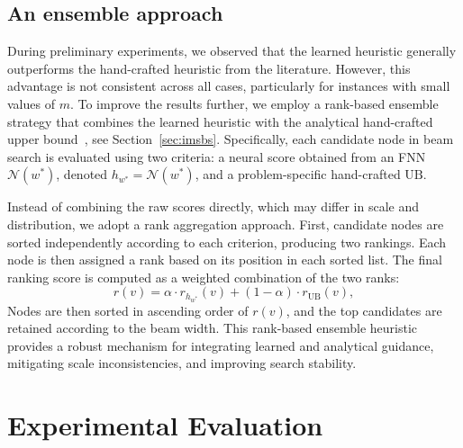 \documentclass[runningheads]{llncs}
\begin{document}
    
  \subsection{An ensemble approach}
    
    During preliminary experiments, we observed that the learned heuristic generally outperforms the hand-crafted heuristic from the literature. However, this advantage is not consistent across all cases, particularly for instances with small values of $m$.  To improve the results further, we employ a rank-based ensemble strategy that combines the learned heuristic with the analytical hand-crafted upper bound~\cite{djukanovic2026_eurocast}, see Section~\ref{sec:imsbs}.  Specifically, each candidate node in beam search is evaluated using two criteria: a neural score obtained from an FNN $\mathcal{N}(w^*)$, denoted $h_{w^*}=\mathcal{N}({w^*})$,  and  a problem-specific hand-crafted $\text{UB}$. 
    
    Instead of combining the raw scores directly, which may differ in scale and distribution, we adopt a rank aggregation approach. First, candidate nodes are sorted independently according to each criterion, producing two rankings. Each node is then assigned a rank based on its position in each sorted list.   The final ranking score is computed as a weighted combination of the two ranks:
    \begin{equation}\label{eq:ensemble_heuristic}
        r(v) = \alpha \cdot r_{h_{w^*}}(v) + (1 - \alpha) \cdot r_{\text{UB}}(v),
    \end{equation}
    Nodes are then sorted in ascending order of $r(v)$, and the top candidates are retained according to the beam width. This rank-based ensemble heuristic provides a robust mechanism for integrating learned and analytical guidance, mitigating scale inconsistencies, and improving search stability. 
     
 
\section{Experimental Evaluation}\label{sec:experiments}
\end{document}
